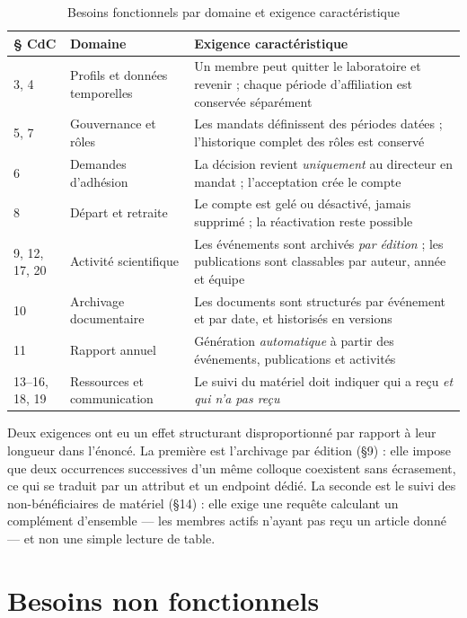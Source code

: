 \begin{table}[H]
\centering
\caption{Besoins fonctionnels par domaine et exigence caractéristique}
\label{tab:besoinsfonc}
\small
\begin{tabularx}{\textwidth}{@{}p{1.1cm}p{3.5cm}X@{}}
\toprule
\textbf{§ CdC} & \textbf{Domaine} & \textbf{Exigence caractéristique} \\
\midrule
3, 4    & Profils et données temporelles & Un membre peut quitter le laboratoire et revenir ; chaque période d'affiliation est conservée séparément \\
5, 7    & Gouvernance et rôles & Les mandats définissent des périodes datées ; l'historique complet des rôles est conservé \\
6       & Demandes d'adhésion & La décision revient \emph{uniquement} au directeur en mandat ; l'acceptation crée le compte \\
8       & Départ et retraite & Le compte est gelé ou désactivé, jamais supprimé ; la réactivation reste possible \\
9, 12, 17, 20 & Activité scientifique & Les événements sont archivés \emph{par édition} ; les publications sont classables par auteur, année et équipe \\
10      & Archivage documentaire & Les documents sont structurés par événement et par date, et historisés en versions \\
11      & Rapport annuel & Génération \emph{automatique} à partir des événements, publications et activités \\
13--16, 18, 19 & Ressources et communication & Le suivi du matériel doit indiquer qui a reçu \emph{et qui n'a pas reçu} \\
\bottomrule
\end{tabularx}
\end{table}

Deux exigences ont eu un effet structurant disproportionné par rapport à leur longueur
dans l'énoncé. La première est l'archivage par édition (§9) : elle impose que deux
occurrences successives d'un même colloque coexistent sans écrasement, ce qui se traduit
par un attribut  et un endpoint dédié. La seconde est le suivi des
non-bénéficiaires de matériel (§14) : elle exige une requête calculant un complément
d'ensemble --- les membres actifs n'ayant pas reçu un article donné --- et non une simple
lecture de table.

\section{Besoins non fonctionnels}

